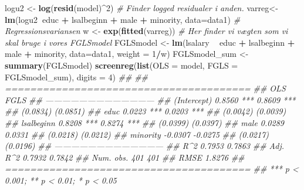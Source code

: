 \documentclass[
  10pt,
]{article}
\newenvironment{Shaded}{\begin{snugshade}}{\end{snugshade}}
\newcommand{\CommentTok}[1]{\textcolor[rgb]{0.56,0.35,0.01}{\textit{#1}}}
\newcommand{\DataTypeTok}[1]{\textcolor[rgb]{0.13,0.29,0.53}{#1}}
\newcommand{\DecValTok}[1]{\textcolor[rgb]{0.00,0.00,0.81}{#1}}
\newcommand{\KeywordTok}[1]{\textcolor[rgb]{0.13,0.29,0.53}{\textbf{#1}}}
\newcommand{\NormalTok}[1]{#1}
\newcommand{\OperatorTok}[1]{\textcolor[rgb]{0.81,0.36,0.00}{\textbf{#1}}}
\newcommand{\StringTok}[1]{\textcolor[rgb]{0.31,0.60,0.02}{#1}}
\begin{document}
\begin{Shaded}
\begin{Highlighting}[]
\NormalTok{logu2 <-}\StringTok{ }\KeywordTok{log}\NormalTok{(}\KeywordTok{resid}\NormalTok{(model)}\OperatorTok{^}\DecValTok{2}\NormalTok{) }\CommentTok{# Finder logged residualer i anden. }
\NormalTok{varreg<-}\StringTok{ }\KeywordTok{lm}\NormalTok{(logu2}\OperatorTok{~}\NormalTok{educ }\OperatorTok{+}\StringTok{ }\NormalTok{lsalbeginn }\OperatorTok{+}\StringTok{ }\NormalTok{male }\OperatorTok{+}\StringTok{ }\NormalTok{minority, }\DataTypeTok{data=}\NormalTok{data1) }\CommentTok{# Regressionsvariansen }
\NormalTok{w <-}\StringTok{ }\KeywordTok{exp}\NormalTok{(}\KeywordTok{fitted}\NormalTok{(varreg)) }\CommentTok{# Her finder vi vægten som vi skal bruge i vores FGLSmodel}
\NormalTok{FGLSmodel <-}\StringTok{ }\KeywordTok{lm}\NormalTok{(lsalary }\OperatorTok{~}\StringTok{ }\NormalTok{educ }\OperatorTok{+}\StringTok{ }\NormalTok{lsalbeginn }\OperatorTok{+}\StringTok{ }\NormalTok{male }\OperatorTok{+}\StringTok{ }\NormalTok{minority, }\DataTypeTok{data=}\NormalTok{data1, }\DataTypeTok{weight =} \DecValTok{1}\OperatorTok{/}\NormalTok{w)}
\NormalTok{FGLSmodel_sum <-}\StringTok{ }\KeywordTok{summary}\NormalTok{(FGLSmodel)}
\KeywordTok{screenreg}\NormalTok{(}\KeywordTok{list}\NormalTok{(}\DataTypeTok{OLS =}\NormalTok{ model, }\DataTypeTok{FGLS =}\NormalTok{ FGLSmodel_sum), }\DataTypeTok{digits =} \DecValTok{4}\NormalTok{)}
\CommentTok{## }
\CommentTok{## =======================================}
\CommentTok{##              OLS           FGLS        }
\CommentTok{## ---------------------------------------}
\CommentTok{## (Intercept)    0.8560 ***    0.8609 ***}
\CommentTok{##               (0.0834)      (0.0851)   }
\CommentTok{## educ           0.0223 ***    0.0203 ***}
\CommentTok{##               (0.0042)      (0.0039)   }
\CommentTok{## lsalbeginn     0.8208 ***    0.8274 ***}
\CommentTok{##               (0.0399)      (0.0397)   }
\CommentTok{## male           0.0289        0.0331    }
\CommentTok{##               (0.0218)      (0.0212)   }
\CommentTok{## minority      -0.0307       -0.0275    }
\CommentTok{##               (0.0217)      (0.0196)   }
\CommentTok{## ---------------------------------------}
\CommentTok{## R^2            0.7953        0.7863    }
\CommentTok{## Adj. R^2       0.7932        0.7842    }
\CommentTok{## Num. obs.    401           401         }
\CommentTok{## RMSE                         1.8276    }
\CommentTok{## =======================================}
\CommentTok{## *** p < 0.001; ** p < 0.01; * p < 0.05}
\end{Highlighting}
\end{Shaded}
\end{document}
